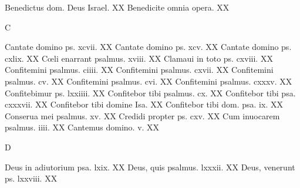 \documentclass[a5paper,10pt]{book}
\def\oe{œ}
\begin{document}
\begin{multicols}{2}
\newline Benedictus dom. Deus Israel. \hfill XX
\newline Benedicite omnia opera. \hfill XX
\newline \vspace{-1.75em}
\begin{center}
\color{red} C
\end{center}
\vspace{-.75em}
\par \noindent Cantate domino ps. xcvii. \hfill XX
\newline Cantate domino ps. xcv. \hfill XX
\newline Cantate domino ps. cxlix. \hfill XX
\newline C\oe li enarrant psalmus. xviii. \hfill XX
\newline Clamaui in toto ps. cxviii. \hfill XX
\newline Confitemini psalmus. ciiii. \hfill XX
\newline Confitemini psalmus. cxvii. \hfill XX
\newline Confitemini psalmus. cv. \hfill XX
\newline Confitemini psalmus. cvi. \hfill XX
\newline Confitemini psalmus. cxxxv. \hfill XX
\newline Confitebimur ps. lxxiiii. \hfill XX
\newline Confitebor tibi psalmus. cx. \hfill XX
\newline Confitebor tibi psa. cxxxvii. \hfill XX
\newline Confitebor tibi domine Isa. \hfill XX
\newline Confitebor tibi dom. psa. ix. \hfill XX
\newline Conserua mei psalmus. xv. \hfill XX
\newline Credidi propter ps. cxv. \hfill XX
\newline Cum inuocarem psalmus. iiii. \hfill XX
\newline Cantemus domino. v. \hfill XX
\newline \vspace{-1.75em}
\begin{center}
\color{red} D
\end{center}
\vspace{-.75em}
\par \noindent Deus in adiutorium psa. lxix. \hfill XX
\newline Deus, quis psalmus. lxxxii. \hfill XX
\newline Deus, venerunt ps. lxxviii. \hfill XX

\end{multicols}
\end{document}
